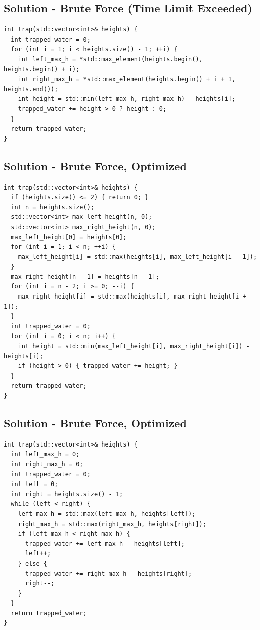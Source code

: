 \subsection*{Solution - Brute Force (Time Limit Exceeded)}\label{solution:lc0042_brute_force}
\begin{lstlisting}
int trap(std::vector<int>& heights) {
  int trapped_water = 0;
  for (int i = 1; i < heights.size() - 1; ++i) {
    int left_max_h = *std::max_element(heights.begin(), heights.begin() + i);
    int right_max_h = *std::max_element(heights.begin() + i + 1, heights.end());
    int height = std::min(left_max_h, right_max_h) - heights[i];
    trapped_water += height > 0 ? height : 0;
  }
  return trapped_water;
}
\end{lstlisting}

\subsection*{Solution - Brute Force, Optimized}\label{solution:lc0042_brute_force_optimized_1}
\begin{lstlisting}
int trap(std::vector<int>& heights) {
  if (heights.size() <= 2) { return 0; }
  int n = heights.size();
  std::vector<int> max_left_height(n, 0);
  std::vector<int> max_right_height(n, 0);
  max_left_height[0] = heights[0];
  for (int i = 1; i < n; ++i) {
    max_left_height[i] = std::max(heights[i], max_left_height[i - 1]);
  }
  max_right_height[n - 1] = heights[n - 1];
  for (int i = n - 2; i >= 0; --i) {
    max_right_height[i] = std::max(heights[i], max_right_height[i + 1]);
  }
  int trapped_water = 0;
  for (int i = 0; i < n; i++) {
    int height = std::min(max_left_height[i], max_right_height[i]) - heights[i];
    if (height > 0) { trapped_water += height; }
  }
  return trapped_water;
}
\end{lstlisting}

\subsection*{Solution - Brute Force, Optimized}\label{solution:lc0042_brute_force_optimized_2}
\begin{lstlisting}
int trap(std::vector<int>& heights) {
  int left_max_h = 0;
  int right_max_h = 0;
  int trapped_water = 0;
  int left = 0;
  int right = heights.size() - 1;
  while (left < right) {
    left_max_h = std::max(left_max_h, heights[left]);
    right_max_h = std::max(right_max_h, heights[right]);
    if (left_max_h < right_max_h) {
      trapped_water += left_max_h - heights[left];
      left++;
    } else {
      trapped_water += right_max_h - heights[right];
      right--;
    }
  }
  return trapped_water;
}
\end{lstlisting}

